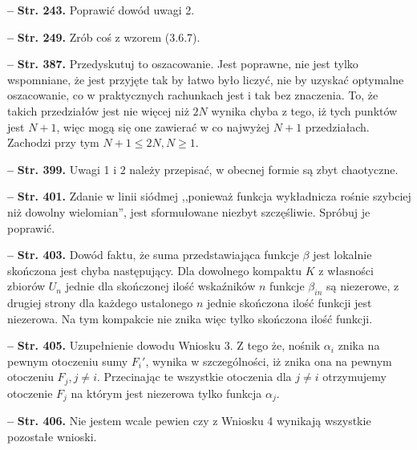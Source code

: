 \documentclass[a4paper]{article}
\newcommand{\tb}{\textbf}
\newcommand{\noi}{\noindent}
\newcommand{\start}{\noi \tb{--} {}}
\newcommand{\Str}[1]{\tb{Str. #1.}}
\begin{document}
\start \Str{243} Poprawić dowód uwagi 2.
  
\start \Str{249} Zrób coś z wzorem (3.6.7).
  
\start \Str{387} Przedyskutuj to oszacowanie. Jest poprawne, nie jest
tylko wspomniane, że jest przyjęte tak by łatwo było liczyć, nie by
uzyskać optymalne oszacowanie, co w praktycznych rachunkach jest i tak
bez znaczenia. To, że takich przedziałów jest nie więcej niż $2N$
wynika chyba z tego, iż tych punktów jest $N+1$, więc mogą się one
zawierać w co najwyżej $N + 1$ przedziałach. Zachodzi przy tym
$N + 1 \leq 2 N, N \geq 1$.

\start \Str{399} Uwagi 1 i 2 należy przepisać, w obecnej formie są
zbyt chaotyczne.

\start \Str{401} Zdanie w linii siódmej ,,ponieważ funkcja wykładnicza
rośnie szybciej niż dowolny wielomian'', jest sformułowane niezbyt
szczęśliwie. Spróbuj je poprawić.

\start \Str{403} Dowód faktu, że suma przedstawiająca funkcje $\beta$
jest lokalnie skończona jest chyba następujący. Dla dowolnego kompaktu
$K$ z własności zbiorów $U_{ n }$ jednie dla skończonej ilość
wskaźników $n$ funkcje $\beta_{ i n }$ są niezerowe, z drugiej strony
dla każdego ustalonego $n$ jednie skończona ilość funkcji jest
niezerowa. Na tym kompakcie nie znika więc tylko skończona ilość
funkcji.

\start \Str{405} Uzupełnienie dowodu Wniosku 3. Z tego że, nośnik
$\alpha_{ i }$ znika na pewnym otoczeniu sumy $F_{ i }'$, wynika w
szczególności, iż znika ona na pewnym otoczeniu $F_{ j }, j \neq i$.
Przecinając te wszystkie otoczenia dla $j \neq i$ otrzymujemy
otoczenie $F_{ j }$ na którym jest niezerowa tylko funkcja
$\alpha_{ j }$.

\start \Str{406} Nie jestem wcale pewien czy z Wniosku 4 wynikają
wszystkie pozostałe wnioski.
\end{document}
